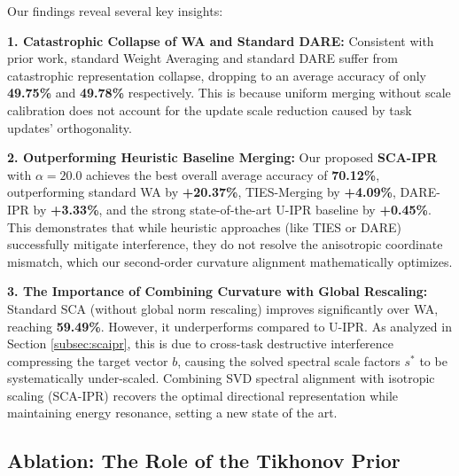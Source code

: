 \documentclass{article}
\theoremstyle{plain}
\theoremstyle{definition}
\theoremstyle{remark}
\begin{document}
Our findings reveal several key insights:

\textbf{1. Catastrophic Collapse of WA and Standard DARE:} Consistent with prior work, standard Weight Averaging and standard DARE suffer from catastrophic representation collapse, dropping to an average accuracy of only \textbf{49.75\%} and \textbf{49.78\%} respectively. This is because uniform merging without scale calibration does not account for the update scale reduction caused by task updates' orthogonality.

\textbf{2. Outperforming Heuristic Baseline Merging:} Our proposed \textbf{SCA-IPR} with $\alpha=20.0$ achieves the best overall average accuracy of \textbf{70.12\%}, outperforming standard WA by \textbf{+20.37\%}, TIES-Merging by \textbf{+4.09\%}, DARE-IPR by \textbf{+3.33\%}, and the strong state-of-the-art U-IPR baseline by \textbf{+0.45\%}. This demonstrates that while heuristic approaches (like TIES or DARE) successfully mitigate interference, they do not resolve the anisotropic coordinate mismatch, which our second-order curvature alignment mathematically optimizes.

\textbf{3. The Importance of Combining Curvature with Global Rescaling:} Standard SCA (without global norm rescaling) improves significantly over WA, reaching \textbf{59.49\%}. However, it underperforms compared to U-IPR. As analyzed in Section \ref{subsec:scaipr}, this is due to cross-task destructive interference compressing the target vector $b$, causing the solved spectral scale factors $s^*$ to be systematically under-scaled. Combining SVD spectral alignment with isotropic scaling (SCA-IPR) recovers the optimal directional representation while maintaining energy resonance, setting a new state of the art.

\subsection{Ablation: The Role of the Tikhonov Prior}
\label{subsec:ablation_tikhonov}
\end{document}
